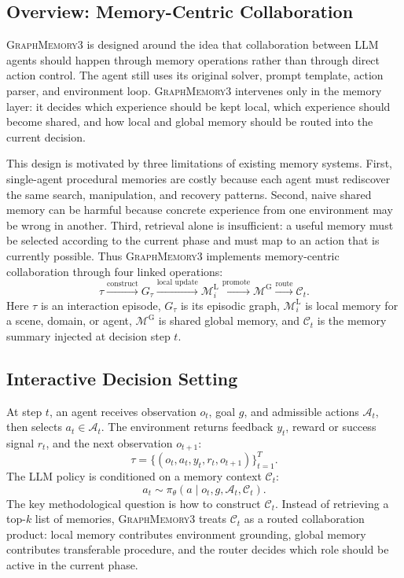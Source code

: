 \documentclass[11pt]{article}
\newcommand{\modelname}{\textsc{GraphMemory3}\xspace}
\newcommand{\localmem}{\mathcal{M}^{\mathrm{L}}}
\newcommand{\globalmem}{\mathcal{M}^{\mathrm{G}}}
\newcommand{\actions}{\mathcal{A}}
\begin{document}
\subsection{Overview: Memory-Centric Collaboration}

\modelname is designed around the idea that collaboration between LLM agents
should happen through memory operations rather than through direct action control.
The agent still uses its original solver, prompt template, action parser, and
environment loop. \modelname intervenes only in the memory layer: it decides which
experience should be kept local, which experience should become shared, and how
local and global memory should be routed into the current decision.

This design is motivated by three limitations of existing memory systems. First,
single-agent procedural memories are costly because each agent must rediscover the
same search, manipulation, and recovery patterns. Second, naive shared memory can
be harmful because concrete experience from one environment may be wrong in
another. Third, retrieval alone is insufficient: a useful memory must be selected
according to the current phase and must map to an action that is currently
possible. Thus \modelname implements memory-centric collaboration through four
linked operations:
\begin{equation}
    \tau
    \xrightarrow{\text{construct}}
    G_{\tau}
    \xrightarrow{\text{local update}}
    \localmem_i
    \xrightarrow{\text{promote}}
    \globalmem
    \xrightarrow{\text{route}}
    \mathcal{C}_t .
\end{equation}
Here $\tau$ is an interaction episode, $G_{\tau}$ is its episodic graph,
$\localmem_i$ is local memory for a scene, domain, or agent, $\globalmem$ is shared
global memory, and $\mathcal{C}_t$ is the memory summary injected at decision step
$t$.

\subsection{Interactive Decision Setting}

At step $t$, an agent receives observation $o_t$, goal $g$, and admissible actions
$\actions_t$, then selects $a_t \in \actions_t$. The environment returns feedback
$y_t$, reward or success signal $r_t$, and the next observation $o_{t+1}$:
\begin{equation}
    \tau =
    \bigl\{(o_t, a_t, y_t, r_t, o_{t+1})\bigr\}_{t=1}^{T}.
\end{equation}
The LLM policy is conditioned on a memory context $\mathcal{C}_t$:
\begin{equation}
    a_t \sim
    \pi_{\theta}
    \left(a \mid o_t, g, \actions_t, \mathcal{C}_t\right).
\end{equation}
The key methodological question is how to construct $\mathcal{C}_t$. Instead of
retrieving a top-$k$ list of memories, \modelname treats $\mathcal{C}_t$ as a
routed collaboration product: local memory contributes environment grounding,
global memory contributes transferable procedure, and the router decides which
role should be active in the current phase.
\end{document}
